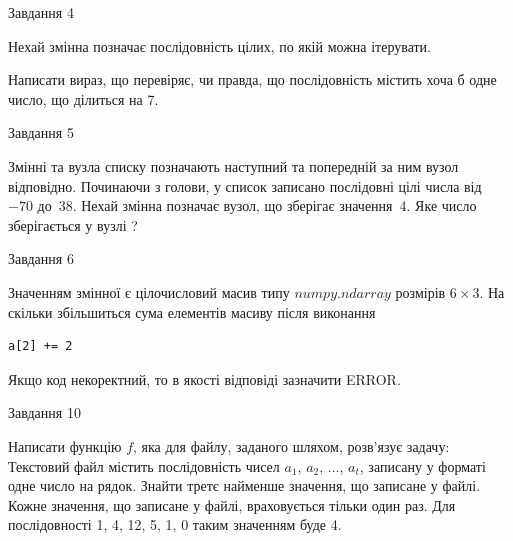 \documentclass[12pt, ukrainian]{article}
\begin{document}
{\begin{minipage}[t]{8.0cm}
\end{minipage}


               
{\begin{center}Завдання {4}\end{center}}
\vspace{-4mm}
Нехай змінна  позначає послідовність цілих, по якій можна ітерувати.

Написати вираз, що перевіряє, чи правда, що послідовність  містить хоча б одне число, що ділиться на 7.\par

\vspace{10mm}
               
{\begin{center}Завдання {5}\end{center}}
\vspace{-4mm}
Змінні  та  вузла списку позначають наступний та попередній за ним вузол відповідно. Починаючи з голови, у список записано послідовні цілі числа від~$-70$ до~$38$. Нехай змінна  позначає вузол, що зберігає значення~$4$.
Яке число зберігається у вузлі  ?\par

               
{\begin{center}Завдання {6}\end{center}}
\vspace{-4mm}
Значенням змінної  є цілочисловий масив типу $numpy.ndarray$ розмірів $6{\times}3$. На скільки збільшиться сума елементів масиву  після виконання
\begin{verbatim}
a[2] += 2
\end{verbatim}


Якщо код некоректний, то в якості відповіді зазначити ERROR.\par

               
{\begin{center}Завдання {10}\end{center}}
\vspace{-4mm}

Написати функцію $f$, яка для файлу, заданого шляхом, розв’язує задачу:\\ Текстовий файл містить послідовність чисел $a_1$, $a_2$, $\ldots$, $a_t$, записану у форматі одне число на рядок. Знайти третє найменше значення, що записане у файлі. Кожне значення, що записане у файлі, враховується тільки один раз. Для послідовності 1, 4, 12, 5, 1, 0 таким значенням буде 4.

}
\end{document}
